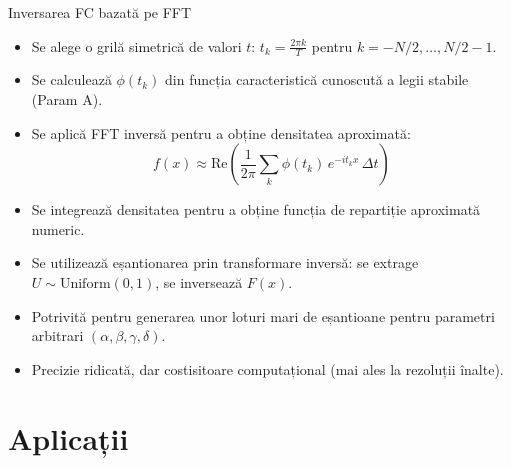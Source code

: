 \documentclass[9pt, aspectratio=169, t]{beamer}
\theoremstyle{definition}
\begin{document}
\begin{frame}{Inversarea FC bazată pe FFT}
\begin{itemize}
    \item Se alege o grilă simetrică de valori $t$: $t_k = \frac{2\pi k}{T}$ pentru $k = -N/2, \ldots, N/2-1$.
    \item Se calculează $\phi(t_k)$ din funcția caracteristică cunoscută a legii stabile (Param A).
    \item Se aplică FFT inversă pentru a obține densitatea aproximată:
    \[
        f(x) \approx \text{Re}\left(\frac{1}{2\pi}\sum_k \phi(t_k)\, e^{-it_k x}\,\Delta t\right)
    \]
    \item Se integrează densitatea pentru a obține funcția de repartiție aproximată numeric.
    \item Se utilizează eșantionarea prin transformare inversă: se extrage $U \sim \text{Uniform}(0,1)$, se inversează $F(x)$.
    \item Potrivită pentru generarea unor loturi mari de eșantioane pentru parametri arbitrari $(\alpha, \beta, \gamma, \delta)$.
    \item Precizie ridicată, dar costisitoare computațional (mai ales la rezoluții înalte).
\end{itemize}
\end{frame}

\section{Aplicații}
\end{document}
